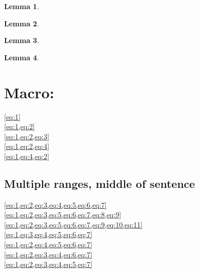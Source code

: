 \documentclass{article}
\newtheorem{lemma}{Lemma}
\begin{document}
  \begin{lemma} 
    \label{result:lemma 1}
  \end{lemma}
  \begin{lemma}
    \label{result:lemma 2}
  \end{lemma}
  \begin{lemma}
    \label{result:lemma 3}
  \end{lemma}
  \begin{lemma}
    \label{result:lemma 4}
  \end{lemma}
  



\section{Macro: }
\cref{eq:1}\\
\cref{eq:1,eq:2}\\
\cref{eq:1,eq:2,eq:3}\\
\cref{eq:1,eq:2,eq:4}\\
\cref{eq:1,eq:4,eq:2}\\

\subsection{Multiple ranges, middle of sentence}
\cref{eq:1,eq:2,eq:3,eq:4,eq:5,eq:6,eq:7}\\
\cref{eq:1,eq:2,eq:3,eq:5,eq:6,eq:7,eq:8,eq:9}\\
\cref{eq:1,eq:2,eq:3,eq:5,eq:6,eq:7,eq:9,eq:10,eq:11}\\
\cref{eq:1,eq:3,eq:4,eq:5,eq:6,eq:7}\\
\cref{eq:1,eq:2,eq:4,eq:5,eq:6,eq:7}\\
\cref{eq:1,eq:2,eq:3,eq:4,eq:6,eq:7}\\
\cref{eq:1,eq:2,eq:3,eq:4,eq:5,eq:7}\\
\end{document}
